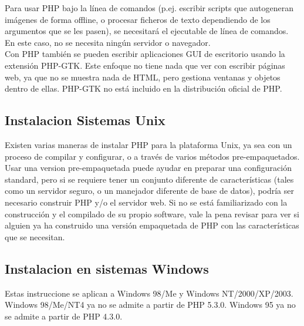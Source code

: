 \documentclass[11pt]{article} %
\begin{document}
Para usar PHP bajo la línea de comandos (p.ej. escribir scripts que autogeneran imágenes de forma offline, o procesar ficheros de texto dependiendo de los argumentos que se les pasen),  se necesitará el ejecutable de línea de comandos. En este caso, no se necesita ningún servidor o navegador.\\

Con PHP también se pueden escribir aplicaciones GUI de escritorio usando la extensión PHP-GTK. Este enfoque no tiene nada que ver con escribir páginas web, ya que no se muestra nada de HTML, pero gestiona ventanas y objetos dentro de ellas. PHP-GTK no está incluido en la distribución oficial de PHP.

\subsection{Instalacion Sistemas Unix}

Existen varias maneras de instalar PHP para la plataforma Unix, ya sea con un proceso de compilar y configurar, o a través de varios métodos pre-empaquetados. Usar una version pre-empaquetada puede ayudar en preparar una configuración standard, pero si se requiere tener un conjunto diferente de características (tales como un servidor seguro, o un manejador diferente de base de datos), podría ser necesario construir PHP y/o el servidor web. Si no se está familiarizado con la construcción y el compilado de su propio software, vale la pena revisar para ver si alguien ya ha construido una versión empaquetada de PHP con las características que se necesitan.

\subsection{Instalacion en sistemas Windows}

Estas instruccione se aplican a Windows 98/Me y Windows NT/2000/XP/2003. Windows 98/Me/NT4 ya no se admite a partir de PHP 5.3.0. Windows 95 ya no se admite a partir de PHP 4.3.0.
\end{document}
